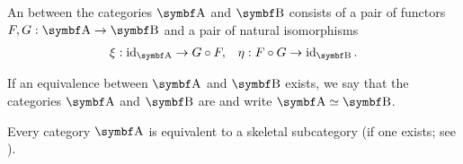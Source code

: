 \begin{definition}\label{def:category_equivalence}
  An  between the categories \( \Cat{A} \) and \( \Cat{B} \) consists of a pair of functors \( F, G: \Cat{A} \to \Cat{B} \) and a pair of natural isomorphisms
  \begin{align*}
    \xi: \Id_{\Cat{A}} \to G \circ F,
    &&
    \eta: F \circ G \to \Id_{\Cat{B}}.
  \end{align*}

  If an equivalence between \( \Cat{A} \) and \( \Cat{B} \) exists, we say that the categories \( \Cat{A} \) and \( \Cat{B} \) are  and write \( \Cat{A} \simeq \Cat{B} \).
 \end{definition}

\begin{proposition}\label{thm:skeletal_subcategory_equivalence}\cite[91]{MacLane1994}
  Every category \( \Cat{A} \) is equivalent to a skeletal subcategory (if one exists; see ).
\end{proposition}

